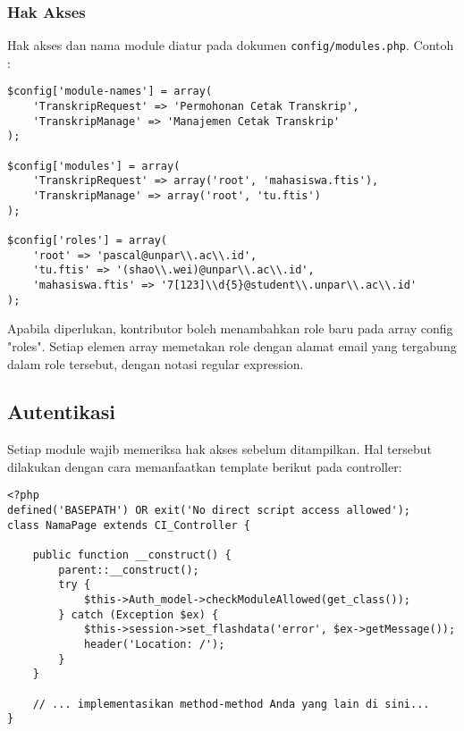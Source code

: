 	\subsubsection{Hak Akses}
		Hak akses dan nama module diatur pada dokumen \texttt{config/modules.php}. Contoh :
\begin{lstlisting}
$config['module-names'] = array(
    'TranskripRequest' => 'Permohonan Cetak Transkrip',
    'TranskripManage' => 'Manajemen Cetak Transkrip'
);

$config['modules'] = array(
    'TranskripRequest' => array('root', 'mahasiswa.ftis'),
    'TranskripManage' => array('root', 'tu.ftis')
);

$config['roles'] = array(
    'root' => 'pascal@unpar\\.ac\\.id',
    'tu.ftis' => '(shao\\.wei)@unpar\\.ac\\.id',
    'mahasiswa.ftis' => '7[123]\\d{5}@student\\.unpar\\.ac\\.id'
);
\end{lstlisting}
	
		Apabila diperlukan, kontributor boleh menambahkan role baru pada array config "roles". Setiap elemen array memetakan role dengan alamat email yang tergabung dalam role tersebut, dengan notasi regular expression.

\subsection{Autentikasi}
	Setiap module wajib memeriksa hak akses sebelum ditampilkan. Hal tersebut dilakukan dengan cara memanfaatkan template berikut pada controller:
\begin{lstlisting}
<?php
defined('BASEPATH') OR exit('No direct script access allowed');
class NamaPage extends CI_Controller {

    public function __construct() {
        parent::__construct();
        try {
            $this->Auth_model->checkModuleAllowed(get_class());
        } catch (Exception $ex) {
            $this->session->set_flashdata('error', $ex->getMessage());
            header('Location: /');
        }
    }

    // ... implementasikan method-method Anda yang lain di sini...
}
\end{lstlisting}

